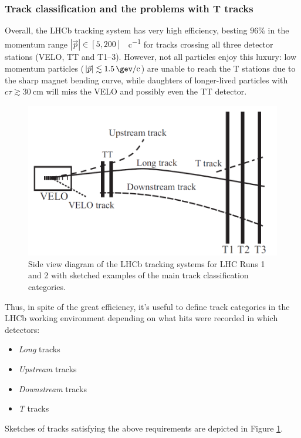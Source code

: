 \subsubsection{Track classification and the problems with T tracks}
Overall, the LHCb tracking system has very high efficiency, besting $96\%$ in the momentum range $|\vec{p}| \in \left[5, 200\right]$ \si{\gev\per c} for tracks crossing all three detector stations (VELO, TT and T1--3). \cite{HistoryLHCb}
However, not all particles enjoy this luxury:
low momentum particles ($|\vec{p}| \lesssim \SI{1.5}{\gev\per c}$) are unable to reach the T stations due to the sharp magnet bending curve, while daughters of longer-lived particles with $c\tau \gtrsim \SI{30}{\centi\meter}$ will miss the VELO and possibly even the TT detector.

\begin{figure}[t]
	\centering
	\includegraphics[width=.8\textwidth]{graphics/02-lhcb/Track_Definitions.png}
	\caption[Side view diagram of LHCb tracking system and track categories.]{Side view diagram of the LHCb tracking systems for LHC Runs 1 and 2 with sketched examples of the main track classification categories.}
	\label{fig:2:track_classification}
\end{figure}

Thus, in spite of the great efficiency, it's useful to define track categories in the LHCb working environment depending on what hits were recorded in which detectors:
\begin{itemize}
	\item \textit{Long} tracks
	\item \textit{Upstream} tracks
	\item \textit{Downstream} tracks
	\item \textit{T} tracks
\end{itemize}
Sketches of tracks satisfying the above requirements are depicted in Figure \ref{fig:2:track_classification}.

